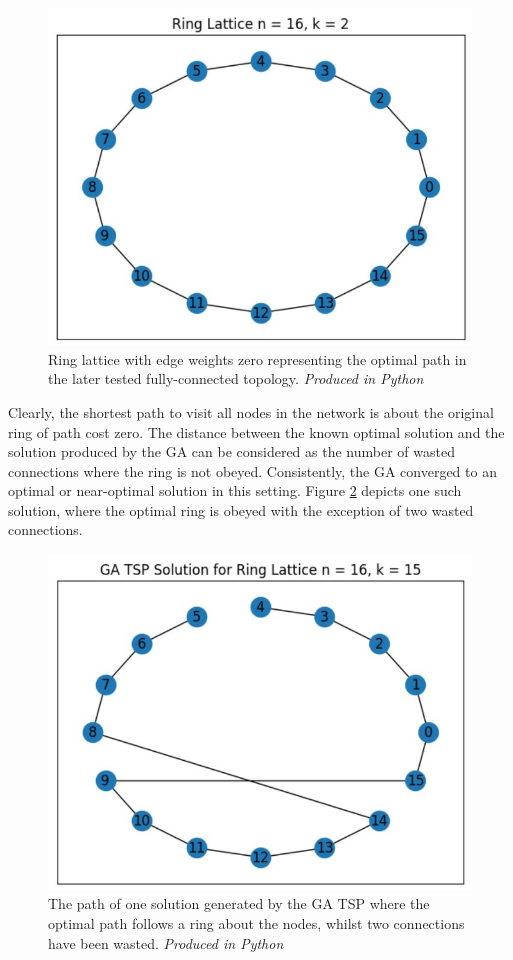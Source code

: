 \documentclass[
	a4paper, %
	10pt, %
	unnumberedsections, %
	twoside, %
]{LTJournalArticle}
\begin{document}
\begin{figure}[H]
	\includegraphics[width=\linewidth]{Figures/tsp/ring_optimal.jpg}
	\caption{Ring lattice with edge weights zero representing the optimal path in the later tested fully-connected topology. \emph{Produced in Python}}
	\label{fig:ring_optimal}
\end{figure}

Clearly, the shortest path to visit all nodes in the network is about the original ring of path cost zero. The distance between the known optimal solution and the solution produced by the GA can be considered as the number of wasted connections where the ring is not obeyed. Consistently, the GA converged to an optimal or near-optimal solution in this setting. Figure \ref{fig:ring_solution} depicts one such solution, where the optimal ring is obeyed with the exception of two wasted connections. \\

\begin{figure}[H]
	\includegraphics[width=\linewidth]{Figures/tsp/ring_solution.jpg}
	\caption{The path of one solution generated by the GA TSP where the optimal path follows a ring about the nodes, whilst two connections have been wasted. \emph{Produced in Python}}
	\label{fig:ring_solution}
\end{figure}
\end{document}
